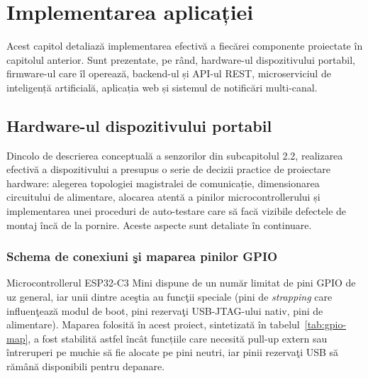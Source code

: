 \documentclass[12pt,a4paper,twoside]{article}
\begin{document}
\newpage
\section{Implementarea aplicației}

Acest capitol detaliază implementarea efectivă a fiecărei componente proiectate în capitolul anterior. Sunt prezentate, pe rând, hardware-ul dispozitivului portabil, firmware-ul care îl operează, backend-ul și API-ul REST, microserviciul de inteligență artificială, aplicația web și sistemul de notificări multi-canal.

\subsection{Hardware-ul dispozitivului portabil}

Dincolo de descrierea conceptuală a senzorilor din subcapitolul 2.2, realizarea efectivă a dispozitivului a presupus o serie de decizii practice de proiectare hardware: alegerea topologiei magistralei de comunicație, dimensionarea circuitului de alimentare, alocarea atentă a pinilor microcontrollerului și implementarea unei proceduri de auto-testare care să facă vizibile defectele de montaj încă de la pornire. Aceste aspecte sunt detaliate în continuare.

\subsubsection{Schema de conexiuni şi maparea pinilor GPIO}

Microcontrollerul ESP32-C3 Mini dispune de un număr limitat de pini GPIO de uz general, iar unii dintre aceştia au funcţii speciale (pini de \textit{strapping} care influenţează modul de boot, pini rezervaţi USB-JTAG-ului nativ, pini de alimentare). Maparea folosită în acest proiect, sintetizată în tabelul~\ref{tab:gpio-map}, a fost stabilită astfel încât funcțiile care necesită pull-up extern sau întreruperi pe muchie să fie alocate pe pini neutri, iar pinii rezervaţi USB să rămână disponibili pentru depanare.
\end{document}

